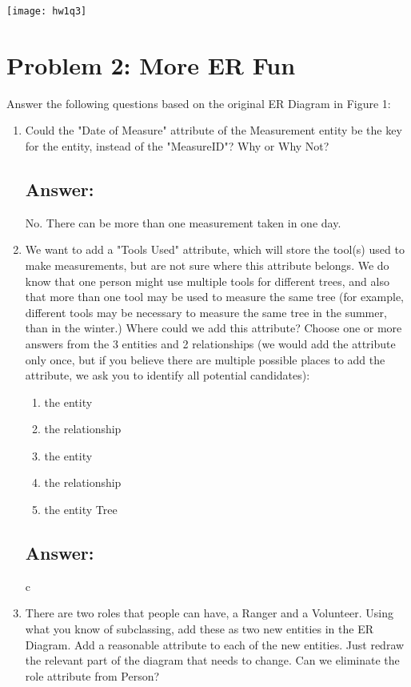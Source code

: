 \documentclass[letter,11pt]{article}
\begin{document}
\texttt{[image: hw1q3]}

\section*{Problem 2: More ER Fun}

Answer the following questions based on the original ER Diagram in Figure 1:

\begin{enumerate}
\item Could the "Date of Measure" attribute of the Measurement entity be the key for the entity, instead of the "MeasureID"? Why or Why Not?
\subsection*{Answer:} No. There can be more than one measurement taken in one day.

\item We want to add a "Tools Used" attribute, which will store the tool(s) used to make measurements, but are not sure where this attribute belongs. We do know that one person might use multiple tools for different trees, and also that more than one tool may be used to measure the same tree (for example, different tools may be necessary to measure the same tree in the summer, than in the winter.) Where could we add this attribute? Choose one or more answers from the 3 entities and 2 relationships (we would add the attribute only once, but if you believe there are multiple possible places to add the attribute, we ask you to identify all potential candidates):
  \begin{enumerate}
  \item the entity 
  \item the relationship 
  \item the entity 
  \item the relationship 
  \item the entity Tree
  \end{enumerate}
\subsection*{Answer:} c

\item There are two roles that people can have, a Ranger and a Volunteer. Using what you know of subclassing, add these as two new entities in the ER Diagram. Add a reasonable attribute to each of the new entities. Just redraw the relevant part of the diagram that needs to change. Can we eliminate the role attribute from Person?

\end{enumerate}
\end{document}
